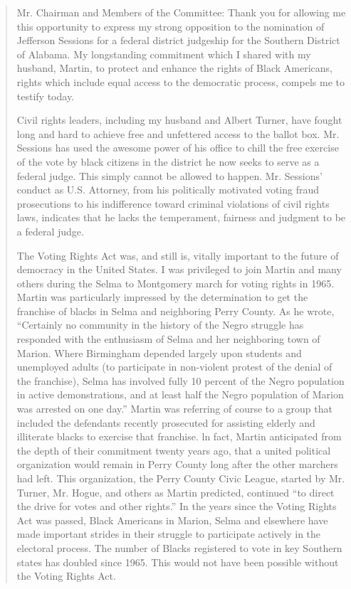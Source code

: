\begin{quote}
Mr. Chairman and Members of the Committee: Thank you for allowing me
this opportunity to express my strong opposition to the nomination of
Jefferson Sessions for a federal district judgeship for the Southern
District of Alabama. My longstanding commitment which I shared with my
husband, Martin, to protect and enhance the rights of Black Americans,
rights which include equal access to the democratic process, compels me
to testify today.

Civil rights leaders, including my husband and Albert Turner, have
fought long and hard to achieve free and unfettered access to the ballot
box. Mr. Sessions has used the awesome power of his office to chill the
free exercise of the vote by black citizens in the district he now seeks
to serve as a federal judge. This simply cannot be allowed to happen.
Mr. Sessions' conduct as U.S. Attorney, from his politically motivated
voting fraud prosecutions to his indifference toward criminal violations
of civil rights laws, indicates that he lacks the temperament, fairness
and judgment to be a federal judge.

The Voting Rights Act was, and still is, vitally important to the future
of democracy in the United States. I was privileged to join Martin and
many others during the Selma to Montgomery march for voting rights in
1965. Martin was particularly impressed by the determination to get the
franchise of blacks in Selma and neighboring Perry County. As he wrote,
``Certainly no community in the history of the Negro struggle has
responded with the enthusiasm of Selma and her neighboring town of
Marion. Where Birmingham depended largely upon students and unemployed
adults (to participate in non-violent protest of the denial of the
franchise), Selma has involved fully 10 percent of the Negro population
in active demonstrations, and at least half the Negro population of
Marion was arrested on one day.'' Martin was referring of course to a
group that included the defendants recently prosecuted for assisting
elderly and illiterate blacks to exercise that franchise. ln fact,
Martin anticipated from the depth of their commitment twenty years ago,
that a united political organization would remain in Perry County long
after the other marchers had left. This organization, the Perry County
Civic League, started by Mr. Turner, Mr. Hogue, and others as Martin
predicted, continued ``to direct the drive for votes and other rights.''
In the years since the Voting Rights Act was passed, Black Americans in
Marion, Selma and elsewhere have made important strides in their
struggle to participate actively in the electoral process. The number of
Blacks registered to vote in key Southern states has doubled since 1965.
This would not have been possible without the Voting Rights Act.


\end{quote}
